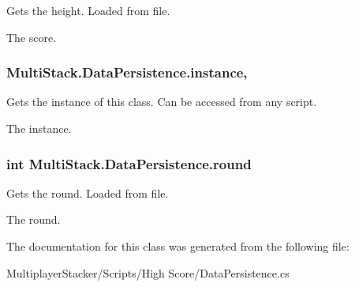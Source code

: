 Gets the height. Loaded from file. 

The score.\hypertarget{class_multi_stack_1_1_data_persistence_aa35435eca48c1494a7b196403006da91}{}
\subsubsection[{instance}]{ Multi\+Stack.\+Data\+Persistence.\+instance\hspace{0.3cm}{\ttfamily [static]}, {\ttfamily [get]}}\label{class_multi_stack_1_1_data_persistence_aa35435eca48c1494a7b196403006da91}


Gets the instance of this class. Can be accessed from any script. 

The instance.\hypertarget{class_multi_stack_1_1_data_persistence_a964cbc11f47af6acf898c8e4d1e3c2fe}{}
\subsubsection[{round}]{\setlength{\rightskip}{0pt plus 5cm}int Multi\+Stack.\+Data\+Persistence.\+round\hspace{0.3cm}{\ttfamily [get]}}\label{class_multi_stack_1_1_data_persistence_a964cbc11f47af6acf898c8e4d1e3c2fe}


Gets the round. Loaded from file. 

The round.

The documentation for this class was generated from the following file\+:\begin{DoxyCompactItemize}
\item 
Multiplayer\+Stacker/\+Scripts/\+High Score/Data\+Persistence.\+cs\end{DoxyCompactItemize}
